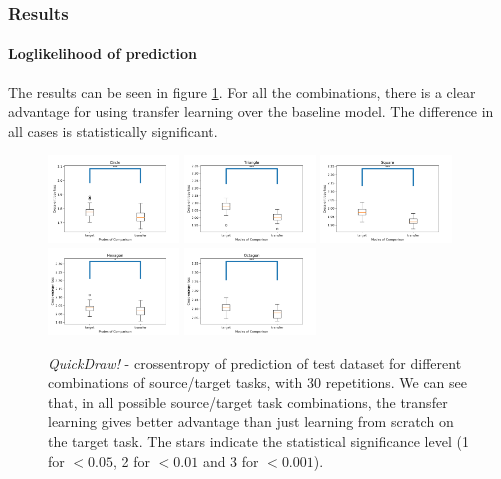     \subsubsection{Results}
      \paragraph{Loglikelihood of prediction}
        The results can be seen in figure \ref{fig:quickdraw_crossentropy}. For all the combinations, there is a clear advantage for using transfer learning over the baseline model. The difference in all cases is statistically significant.
        \begin{figure}
          \centering
            \includegraphics[width=0.31\textwidth]{images/sota/quickdraw_results/cir_ce.png}\quad
            \includegraphics[width=0.31\textwidth]{images/sota/quickdraw_results/tri_ce.png}\quad
            \includegraphics[width=0.31\textwidth]{images/sota/quickdraw_results/sq_ce.png}\quad
            \includegraphics[width=0.31\textwidth]{images/sota/quickdraw_results/hex_ce.png}\quad
            \includegraphics[width=0.31\textwidth]{images/sota/quickdraw_results/oct_ce.png}\quad
          \caption{\textit{QuickDraw!} - crossentropy of prediction of test dataset for different combinations of source/target tasks, with 30 repetitions. We can see that, in all possible source/target task combinations, the transfer learning gives better advantage than just learning from scratch on the target task. The stars indicate the statistical significance level (1 for $<0.05$, 2 for $<0.01$ and 3 for $<0.001$).}
          \label{fig:quickdraw_crossentropy}
        \end{figure}

